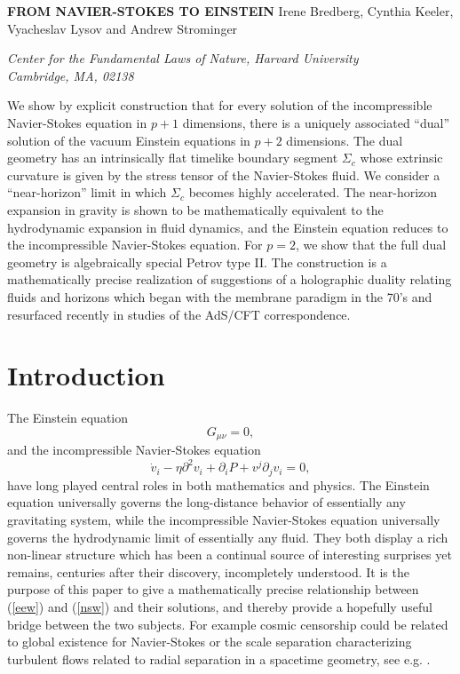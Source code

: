 \documentclass{article}
\def\beq{\begin{equation}}
\def\eeq{\end{equation}}
\def\p{\partial}
\begin{document}
\begin{titlepage}
\centerline{}
\vskip 2in
\begin{center}
{\Large{\bf  FROM NAVIER-STOKES TO EINSTEIN}}
\vskip 0.5in
{Irene Bredberg, Cynthia Keeler, Vyacheslav Lysov
and Andrew Strominger}
\vskip 0.3in
{\it Center for the Fundamental Laws of Nature,
Harvard University\\
Cambridge, MA, 02138

}
\end{center}
\vskip 0.5in
\begin{abstract}

\end{abstract}
We show by explicit construction that for every solution of the incompressible Navier-Stokes equation in $p+1$ dimensions, there is a uniquely  associated  ``dual'' solution of the vacuum Einstein equations in $p+2$ dimensions.  The dual geometry has an intrinsically flat timelike boundary segment $\Sigma_c$ whose extrinsic curvature is given  by the stress tensor of the Navier-Stokes fluid.  We consider a ``near-horizon'' limit in which $\Sigma_c$ becomes highly accelerated.  The near-horizon expansion in gravity is shown to be mathematically equivalent to the hydrodynamic expansion in fluid dynamics, and the Einstein equation reduces to the incompressible Navier-Stokes equation.   For $p=2$, we show that the full dual geometry is algebraically special Petrov type II.  The construction is a mathematically  precise realization of suggestions of a holographic duality relating fluids and horizons which began with the membrane paradigm in the 70's and resurfaced recently in studies of the AdS/CFT correspondence.

\end{titlepage}


\setcounter{page}{1}

\tableofcontents

\newpage
\section{Introduction}

The Einstein equation
\beq \label{eew}{G}_{\mu\nu}=0,\eeq
and  the incompressible Navier-Stokes equation
\beq\label{nsw}  \dot v_i - \eta \p^2v_i+\p_iP+v^j\p_jv_i=0, \eeq
 have long played central roles in both mathematics and physics. The Einstein equation universally governs the long-distance behavior of essentially any gravitating system, while the incompressible Navier-Stokes equation universally governs the hydrodynamic limit of essentially any fluid.
They both display a rich non-linear structure which has been a continual source of interesting surprises yet remains, centuries after their discovery, incompletely understood.  It is the purpose of this paper to give a mathematically precise
relationship between (\ref{eew}) and (\ref{nsw}) and their solutions, and thereby provide a hopefully useful bridge between the two subjects. For example cosmic censorship could be related to global existence for Navier-Stokes or the scale separation characterizing turbulent flows related to radial separation in a spacetime geometry, see e.g. \cite{min,Oz:2010wz}.
\end{document}
